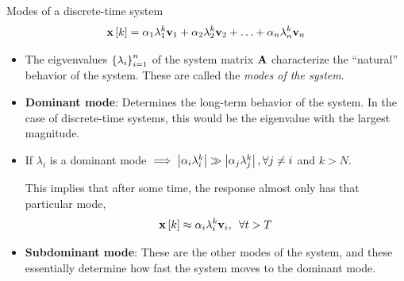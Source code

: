 \documentclass[aspectratio=169]{beamer}
\def\mf{\ensuremath\mathbf}
\def\lv{\ensuremath\left\lvert}
\def\rv{\ensuremath\right\rvert}
\def\lc{\ensuremath\left\{}
\def\rc{\ensuremath\right\}}
\def\ls{\ensuremath\left[}
\def\rs{\ensuremath\right]}
\newcommand{\dt}[1]{\ls #1\rs}
\begin{document}
\begin{frame}[t]{Modes of a discrete-time system}
\vspace{-0.5cm}
\[ \mf{x}\dt{k} = \alpha_1 \lambda_1^k\mf{v}_1 + \alpha_2 \lambda_2^k\mf{v}_2 + \ldots + \alpha_n \lambda_n^k\mf{v}_n\]
\vspace{-0.5cm}

\begin{itemize}
    \item The eigvenvalues $\lc \lambda_i\rc_{i=1}^n$ of the system matrix $\mf{A}$ characterize the ``natural'' behavior of the system. These are called the \textit{modes of the system}.

    \item \textbf{Dominant mode}: Determines the long-term behavior of the system. In the case of discrete-time systems, this would be the eigenvalue with the largest magnitude.

    \item If $\lambda_i$ is a dominant mode $\implies \lv \alpha_i \lambda_i^k \rv \gg \lv \alpha_j \lambda_j^k \rv, \forall j \neq i$ and $k > N$.

    This implies that after some time, the response almost only has that particular mode,
    \[ \mf{x}\dt{k} \approx \alpha_i \lambda_i^k\mf{v}_i, \,\,\, \forall t > T \]

    \item \textbf{Subdominant mode}: These are the other modes of the system, and these essentially determine how fast the system moves to the dominant mode.
\end{itemize}
\end{frame}
\end{document}
